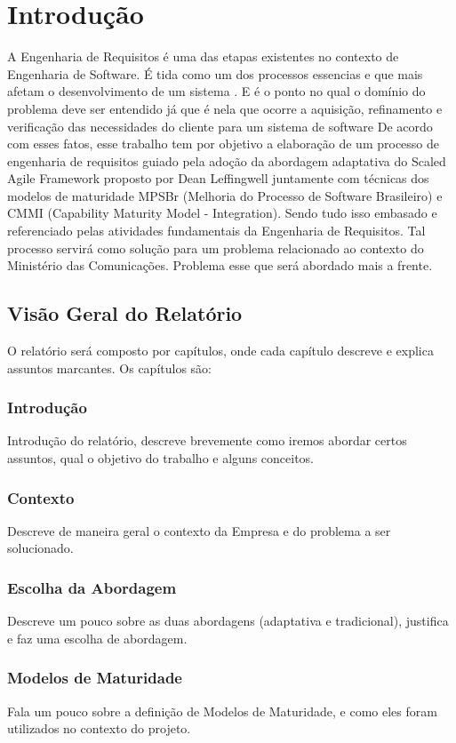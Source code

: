 \chapter[Introdução]{Introdução}

A Engenharia de Requisitos é uma das etapas existentes no contexto de Engenharia de Software. É tida como um dos processos essencias e que mais  afetam o desenvolvimento de um sistema \cite{hofmann001}. E é o ponto no qual o domínio do problema deve ser entendido já que é nela que ocorre a aquisição, refinamento e verificação das necessidades do cliente para um sistema de software \cite{ieee001}
De acordo com esses fatos, esse trabalho tem por objetivo a elaboração de um processo de engenharia de requisitos guiado pela adoção da abordagem adaptativa do Scaled Agile Framework proposto por Dean Leffingwell juntamente com técnicas dos modelos de maturidade MPSBr (Melhoria do Processo de Software Brasileiro) e CMMI (Capability Maturity Model - Integration). Sendo tudo isso embasado e referenciado pelas atividades fundamentais da Engenharia de Requisitos.
Tal processo servirá como solução para um problema relacionado ao contexto do Ministério das Comunicações. Problema esse que será abordado mais a frente.

\section{Visão Geral do Relatório}
O relatório será composto por capítulos, onde cada capítulo descreve e explica assuntos marcantes. Os capítulos são:

\subsection{Introdução}
Introdução do relatório, descreve brevemente como iremos abordar certos assuntos, qual o objetivo do trabalho e alguns conceitos.
\subsection{Contexto}
Descreve de maneira geral o contexto da Empresa e do problema a ser solucionado.
\subsection{Escolha da Abordagem}
Descreve um pouco sobre as duas abordagens (adaptativa e tradicional), justifica e faz uma escolha de abordagem.
\subsection{Modelos de Maturidade}
Fala um pouco sobre a definição de Modelos de Maturidade, e como eles foram utilizados no contexto do projeto.
